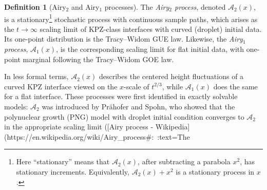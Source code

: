 \documentclass[letterpaper,11pt,oneside,reqno]{article}
\numberwithin{equation}{section}
\theoremstyle{definition}
\newtheorem{definition}[proposition]{Definition}
\begin{document}
\begin{definition}[Airy$_2$ and Airy$_1$ processes]
The \emph{Airy$_2$ process}, denoted $\mathcal{A}_2(x)$, is a stationary\footnote{Here “stationary” means that $\mathcal{A}_2(x)$, after subtracting a parabola $x^2$, has stationary increments. Equivalently, $\mathcal{A}_2(x) + x^2$ is a stationary process in $x$.} stochastic process with continuous sample paths, which arises as the $t\to\infty$ scaling limit of KPZ-class interfaces with curved (droplet) initial data. Its one-point distribution is the Tracy–Widom GUE law. Likewise, the \emph{Airy$_1$ process}, $\mathcal{A}_1(x)$, is the corresponding scaling limit for flat initial data, with one-point marginal following the Tracy–Widom GOE law.
\end{definition}

\noindent In less formal terms, $\mathcal{A}_2(x)$ describes the centered height fluctuations of a curved KPZ interface viewed on the $x$-scale of $t^{2/3}$, while $\mathcal{A}_1(x)$ does the same for a flat interface. These processes were first identified in exactly solvable models: $\mathcal{A}_2$ was introduced by Prähofer and Spohn, who showed that the polynuclear growth (PNG) model with droplet initial condition converges to $\mathcal{A}_2$ in the appropriate scaling limit ([Airy process - Wikipedia](https://en.wikipedia.org/wiki/Airy_process#:~:text=The%
\end{document}
